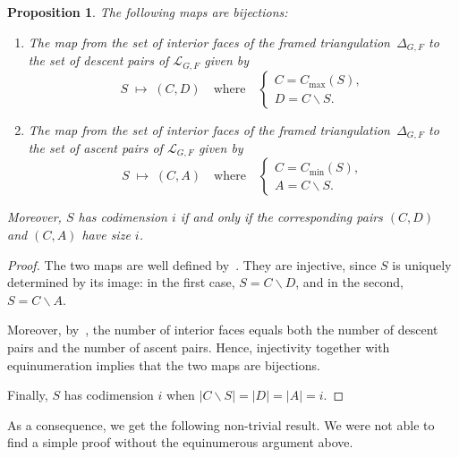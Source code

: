 \documentclass[12pt, reqno]{amsart}
\theoremstyle{plain}
\newtheorem{proposition}[theorem]{Proposition}
\theoremstyle{definition}
\numberwithin{equation}{section}
\newcommand\scrL{\mathscr{L}}
\begin{document}
\begin{proposition}\label{prop_bijection_interior_pairs}
    The following maps are bijections:
    \begin{enumerate}
        \item The map from the set of interior faces of the framed triangulation~$\Delta_{G,F}$ to the set of descent pairs of $\scrL_{G,F}$ given by
        \[
            S \;\longmapsto\; (C,D)
            \quad\text{where}\quad
            \begin{cases}
                C = C_{\max}(S),\\
                D = C \smallsetminus S.
            \end{cases}
        \]
        
        \item The map from the set of interior faces of the framed triangulation~$\Delta_{G,F}$ to the set of ascent pairs of $\scrL_{G,F}$ given by
        \[
            S \;\longmapsto\; (C,A)
            \quad\text{where}\quad
            \begin{cases}
                C = C_{\min}(S),\\
                A = C \smallsetminus S.
            \end{cases}
        \]
    \end{enumerate}
    Moreover, $S$ has codimension $i$ if and only if the corresponding pairs $(C,D)$ and $(C,A)$ have size $i$.
\end{proposition}
\begin{proof}
    The two maps are well defined by~. They are injective, since $S$ is uniquely determined by its image: in the first case, $S = C \smallsetminus D$, and in the second, $S = C \smallsetminus A$.

    Moreover, by~, the number of interior faces equals both the number of descent pairs and the number of ascent pairs. Hence, injectivity together with equinumeration implies that the two maps are bijections.

    Finally, $S$ has codimension $i$ when $|C\smallsetminus S|=|D|=|A|=i$.
\end{proof}

As a consequence, we get the following non-trivial result. We were not able to find a simple proof without the equinumerous argument above.
\end{document}
